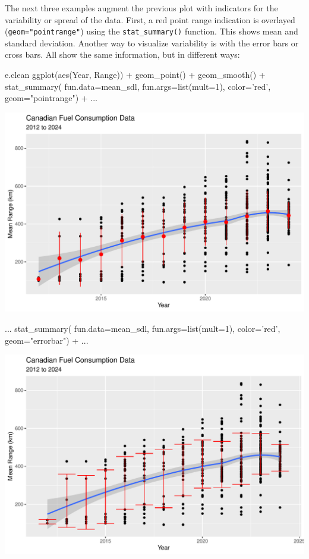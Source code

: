 The next three examples augment the previous plot with indicators for the variability or spread of the data. First, a red point range indication is overlayed (\texttt{geom="pointrange"}) using the \texttt{stat\_summary()} function. This shows mean and standard deviation. Another way to visualize variability is with the error bars or cross bars. All show the same information, but in different ways: 

\begin{samepage}
\begin{Rcode}
e.clean %
  ggplot(aes(Year, Range)) +
    geom_point() +
    geom_smooth() +
    stat_summary(
       fun.data=mean_sdl, 
       fun.args=list(mult=1), 
       color='red', 
       geom="pointrange") +
...
\end{Rcode}
\end{samepage}

\begin{center}
  \includegraphics[width=.8\textwidth]{fuel.linesSmoothPointRange.pdf}
\end{center}


\begin{samepage}
\begin{Rcode}
...
    stat_summary(
        fun.data=mean_sdl, 
        fun.args=list(mult=1), 
        color='red', 
        geom="errorbar") +
...
\end{Rcode}
\end{samepage}

\begin{center}
  \includegraphics[width=.8\textwidth]{fuel.linesSmoothErrorBar.pdf}
\end{center}

